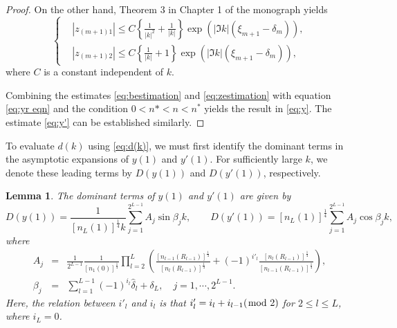 \documentclass[11pt,reqno]{amsart}
\newtheorem{lemma}{Lemma}[section]
\theoremstyle{definition}
\theoremstyle{remark}
\numberwithin{equation}{section}
\begin{document}
\begin{proof}
On the other hand, Theorem 3 in Chapter 1 of the monograph \cite{PT87} yields
\begin{equation}\label{eq:zestimation}
	\left\{
	\begin{aligned}
		& \left|z_{(m+1)1}\right| \leq C \left\{ \frac{1}{|k|^2} + \frac{1}{|k|} \right\}\exp\left(|\Im k| (\xi_{m+1} - \delta_{m})\right), \\
		& \left|z_{(m+1)2}\right| \leq C \left\{ \frac{1}{|k|}+1 \right\}\exp\left(|\Im k| (\xi_{m+1} - \delta_{m})\right),
	\end{aligned}
	\right.
\end{equation}
where $C$ is a constant independent of $k$.
	
Combining the estimates \eqref{eq:bestimation} and \eqref{eq:zestimation} with equation \eqref{eq:yr eqn} and the condition $0 < n* < n < n^*$ yields the result in \eqref{eq:y}. The estimate \eqref{eq:y'} can be established similarly.
\end{proof}


To evaluate $d(k)$ using \eqref{eq:d(k)}, we must first identify the dominant terms in the asymptotic expansions of $y(1)$ and $y'(1)$. For sufficiently large $k$, we denote these leading terms by $D(y(1))$ and $D(y'(1))$, respectively.


\begin{lemma}\label{lem:y(1)_adequate_expression}
The dominant terms of $y(1)$ and $y'(1)$ are given by
\begin{equation}
D(y(1))=\frac{1}{\left[n_L(1)\right]^{\frac{1}{4}}k}\sum_{j=1}^{2^{L-1}}A_j\sin{\beta_j k},  \quad \quad D(y'(1))=\left[n_L(1)\right]^{\frac{1}{4}}\sum_{j=1}^{2^{L-1}}A_j\cos{\beta_j k},
\end{equation}
where
\begin{eqnarray*}
A_{j}&=&\frac{1}{2^{L-1}}\frac{1}{\left[n_{1}(0)\right]^{\frac{1}{4}}}
\prod\limits_{l=2}^{L}\left(\frac{\left[n_{l-1}(R_{l-1})\right]^{\frac{1}{4}}}{\left[n_l(R_{l-1})\right]^{\frac{1}{4}}}+(-1)^{i'_l} \frac{\left[n_l(R_{l-1})\right]^{\frac{1}{4}}}{\left[n_{l-1}(R_{l-1})\right]^{\frac{1}{4}}} \right), \\
\beta_j&=&\sum\limits_{l=1}^{L-1}(-1)^{i_l}\hat{\delta}_l+\delta_{L},\quad j=1,\cdots,2^{L-1}.
\end{eqnarray*}
Here, the relation between $i'_l$ and $i_l$ is that ${i'_l}={i_l + i_{l-1}}(\hspace{-2mm}\mod 2)$ for $2 \le l \le L$, where $i_L=0$.
\end{lemma}
\end{document}

